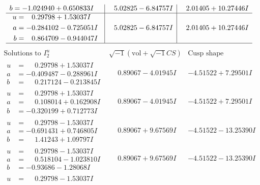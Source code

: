 \documentclass[1p]{elsarticle_modified}
\theoremstyle{definition}
\newcommand{\I}{\sqrt{-1}}
\begin{document}
$$\begin{array}{c|c|c}
\begin{aligned}
b &= -1.024940 + 0.650833 I\end{aligned}
 & \phantom{-}5.02825 - 6.84757 I & \phantom{-}2.01405 + 10.27446 I \\ \hline\begin{aligned}
u &= \phantom{-}0.29798 + 1.53037 I \\
a &= -0.284102 - 0.725051 I \\
b &= \phantom{-}0.864709 - 0.944047 I\end{aligned}
 & \phantom{-}5.02825 - 6.84757 I & \phantom{-}2.01405 + 10.27446 I\\
 \hline 
 \end{array}$$\newpage$$\begin{array}{c|c|c}  
\text{Solutions to }I^u_{2}& \I (\text{vol} + \sqrt{-1}CS) & \text{Cusp shape}\\
 \hline 
\begin{aligned}
u &= \phantom{-}0.29798 + 1.53037 I \\
a &= -0.409487 - 0.288961 I \\
b &= \phantom{-}0.217124 - 0.213845 I\end{aligned}
 & \phantom{-}0.89067 - 4.01945 I & -4.51522 + 7.29501 I \\ \hline\begin{aligned}
u &= \phantom{-}0.29798 + 1.53037 I \\
a &= \phantom{-}0.108014 + 0.162908 I \\
b &= -0.320199 + 0.712773 I\end{aligned}
 & \phantom{-}0.89067 - 4.01945 I & -4.51522 + 7.29501 I \\ \hline\begin{aligned}
u &= \phantom{-}0.29798 - 1.53037 I \\
a &= -0.691431 + 0.746805 I \\
b &= \phantom{-}1.41243 + 1.09797 I\end{aligned}
 & \phantom{-}0.89067 + 9.67569 I & -4.51522 - 13.25390 I \\ \hline\begin{aligned}
u &= \phantom{-}0.29798 - 1.53037 I \\
a &= \phantom{-}0.518104 - 1.023810 I \\
b &= -0.93686 - 1.28068 I\end{aligned}
 & \phantom{-}0.89067 + 9.67569 I & -4.51522 - 13.25390 I \\ \hline\begin{aligned}
u &= \phantom{-}0.29798 - 1.53037 I \\

\end{aligned}
\end{array}$$
\end{document}
